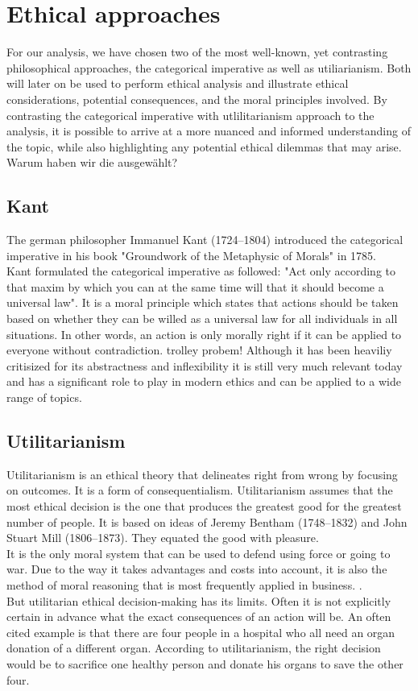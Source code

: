 \documentclass[9pt,twocolumn,twoside]{osajnl}
\begin{document}
\section{Ethical approaches}
For our analysis, we have chosen two of the most well-known, yet contrasting philosophical approaches, the categorical imperative as well as utiliarianism.
Both will later on be used to perform ethical analysis and illustrate ethical considerations, potential consequences, and the moral principles involved.
By contrasting the categorical imperative with utlilitarianism approach to the analysis, it is possible to arrive at a more nuanced and informed understanding of the topic, while also highlighting any potential ethical dilemmas that may arise.
Warum haben wir die ausgewählt?

\subsection{Kant}
The german philosopher Immanuel Kant (1724--1804) introduced the categorical imperative in his book "Groundwork of the Metaphysic of Morals" in 1785. \\
Kant formulated the categorical imperative as followed: "Act only according to that maxim by which you can at the same time will that it should become a universal law". 
It is a moral principle which states that actions should be taken based on whether they can be willed as a universal law for all individuals in all situations. 
In other words, an action is only morally right if it can be applied to everyone without contradiction.
trolley probem!
Although it has been heaviliy critisized for its abstractness and inflexibility it is still very much relevant today and has a significant role to play in modern ethics and can be applied to a wide range of topics.

\subsection{Utilitarianism}
Utilitarianism is an ethical theory that delineates right from wrong by focusing on outcomes. It is a form of consequentialism.
Utilitarianism assumes that the most ethical decision is the one that produces the greatest good for the greatest number of people. It is based on ideas of Jeremy Bentham (1748--1832) and John Stuart Mill (1806--1873). They equated the good with pleasure.\\
It is the only moral system that can be used to defend using force or going to war. Due to the way it takes advantages and costs into account, it is also the method of moral reasoning that is most frequently applied in business. \cite{EthicsUnwrapped}. \\
But utilitarian ethical decision-making has its limits. Often it is not explicitly certain in advance what the exact consequences of an action will be. 
An often cited example is that there are four people in a hospital who all need an organ donation of a different organ. According to utilitarianism, the right decision would be to sacrifice one healthy person and donate his organs to save the other four.
\end{document}
